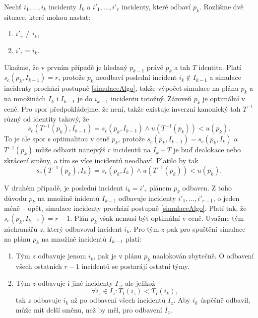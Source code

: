 \begin{dukaz}
  Nechť $i_1, \dots, i_k$ incidenty $I_k$ a $i'_1, \dots, i'_r$ incidenty, které odbaví $p_k$.
  Rozlišme dvě situace, které mohou nastat:
  \begin{enumerate}
    \item
      $i'_r \neq i_k$,

    \item
      $i'_r = i_k$.
  \end{enumerate}
  Ukažme, že v prvním případě je hledaný $p_{k-1}$ právě $p_k$ a tah $T$ identita.
  Platí $s_c(p_k, I_{k-1}) = r$, protože $p_k$ neodbaví poslední incident $i_k \not \in I_{k-1}$ a simulace incidenty prochází postupně \ref{simulaceAlgo},
  takže výpočet simulace na plánu $p_{k}$ a na množinách $I_k$ i $I_{k-1}$ je do $i_{k-1}$ incidentu totožný.
  Zároveň $p_k$ je optimální v ceně. Pro spor předpokládejme, že není, takže existuje inverzní kanonický tah $T^{-1}$ různý od identity takový,
  že
  \begin{equation*}
    s_c(T^{-1}(p_k), I_{k-1}) = s_c(p_k, I_{k-1}) \land u(T^{-1}(p_k)) < u(p_k).
  \end{equation*}
  To je ale spor s optimalitou v ceně $p_k$, protože $s_c(p_k, I_{k-1}) = s_c(p_k, I_k)$ a $T^{-1}(p_k)$ může odbavit nanejvýš $r$ incidentů na $I_k$ -- $T$ je buď dealokace nebo zkrácení směny,
  a tím se více incidentů neodbaví.
  Platilo by tak
  \begin{equation*}
    s_c(T^{-1}(p_k), I_{k}) = s_c(p_k, I_{k}) \land u(T^{-1}(p_k)) < u(p_k).
  \end{equation*}

  V druhém případě, je poslední incident $i_k = i'_r$ plánem $p_k$ odbaven.
  Z toho důvodu $p_k$ na množině inidentů $I_{k-1}$ odbavuje incidenty $i'_1, \dots, i'_{r-1}$, o jeden méně -- opět, simulace incidenty prochází postupně \ref{simulaceAlgo}.
  Platí tak, že $s_c(p_k, I_{k-1}) = r - 1$. Plán $p_k$ však nemusí být optimální v ceně. Uvažme tým záchranářů $z$, který odbavoval incident $i_k$.
  Pro tým $z$ pak pro spuštění simulace na plánu $p_k$ na množině incidentů $I_{k-1}$ platí:

  \begin{enumerate}
    \item
      Tým $z$ odbavuje jenom $i_k$, pak je v plánu $p_k$ naalokován zbytečně. O odbavení všech ostatních $r-1$ incidentů se postarájí ostatní týmy.

    \item
      Tým $z$ odbavuje i jiné incidenty $I_z$, ale jelikož
      \begin{equation*}
        \forall i_z \in I_z \colon T_I(i_z) < T_I(i_k),
      \end{equation*}
      tak $z$ odbavuje $i_k$ až po odbavení všech incidentů $I_z$.
      Aby $i_k$ úspěšně odbavil, může mít delší směnu, než by měl, pro odbavení $I_z$.
  \end{enumerate}


\end{dukaz}
